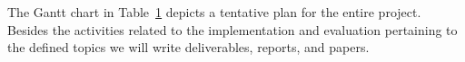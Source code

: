 \begin{table}[t!]
\begin{tabular}{|p{0.80cm}|p{4.80cm}|p{0.40cm}|p{0.40cm}|p{0.40cm}|p{0.40cm}|p{0.40cm}|p{0.40cm}|p{0.40cm}|p{0.40cm}|p{0.40cm}|p{0.40cm}|p{0.40cm}|p{0.40cm}|}
	\end{tabular}
	\label{tab:GanttChart}
\end{table}

The Gantt chart in Table~\ref{tab:GanttChart} depicts a tentative plan for the entire project. %
Besides the activities related to the implementation and evaluation pertaining to the defined topics %
we will write deliverables, reports, and %
papers. %











